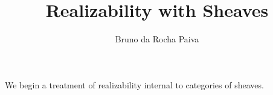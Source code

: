 \documentclass[11pt]{article}
\begin{document}
\title{Realizability with Sheaves}
\author{Bruno da Rocha Paiva}
\maketitle

We begin a treatment of realizability internal to categories of sheaves.

%
%
\end{document}
